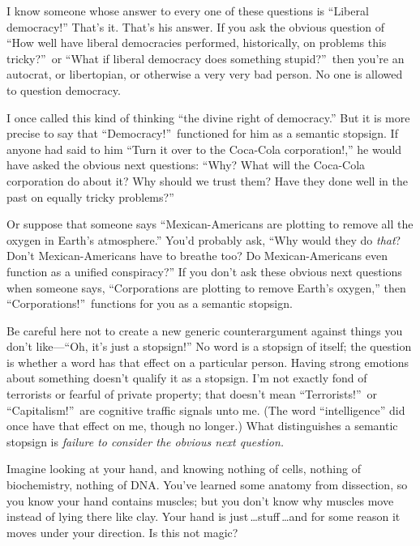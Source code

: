 {
 I know someone whose answer to every one of these questions is
``Liberal democracy!''
That's it. That's his answer. If you
ask the obvious question of ``How well have liberal
democracies performed, historically, on problems this
tricky?''~or ``What if liberal
democracy does something stupid?''~then
you're an autocrat, or libertopian, or otherwise a very
very bad person. No one is allowed to question democracy.}

{
 I once called this kind of thinking ``the divine
right of democracy.'' But it is more precise to say
that ``Democracy!''~functioned for
him as a semantic stopsign. If anyone had said to him
``Turn it over to the Coca-Cola
corporation!,'' he would have asked the obvious next
questions: ``Why? What will the Coca-Cola corporation
do about it? Why should we trust them? Have they done well in the past
on equally tricky problems?''}

{
 Or suppose that someone says ``Mexican-Americans
are plotting to remove all the oxygen in Earth's
atmosphere.'' You'd probably ask,
``Why would they do \textit{that}?
Don't Mexican-Americans have to breathe too? Do
Mexican-Americans even function as a unified
conspiracy?'' If you don't ask these
obvious next questions when someone says,
``Corporations are plotting to remove
Earth's oxygen,'' then
``Corporations!''~functions for you
as a semantic stopsign.}

{
 Be careful here not to create a new generic counterargument
against things you don't like---``Oh,
it's just a stopsign!'' No word is a
stopsign of itself; the question is whether a word has that effect on a
particular person. Having strong emotions about something
doesn't qualify it as a stopsign. I'm
not exactly fond of terrorists or fearful of private property; that
doesn't mean
``Terrorists!''~or
``Capitalism!''~are cognitive
traffic signals unto me. (The word
``intelligence'' did once have that
effect on me, though no longer.) What distinguishes a semantic stopsign
is \textit{failure to consider the obvious next question.}}

\myendsectiontext


{
 Imagine looking at your hand, and knowing nothing of cells,
nothing of biochemistry, nothing of DNA. You've learned
some anatomy from dissection, so you know your hand contains muscles;
but you don't know why muscles move instead of lying
there like clay. Your hand is just\,\ldots stuff\,\ldots and for some
reason it moves under your direction. Is this not magic?}

